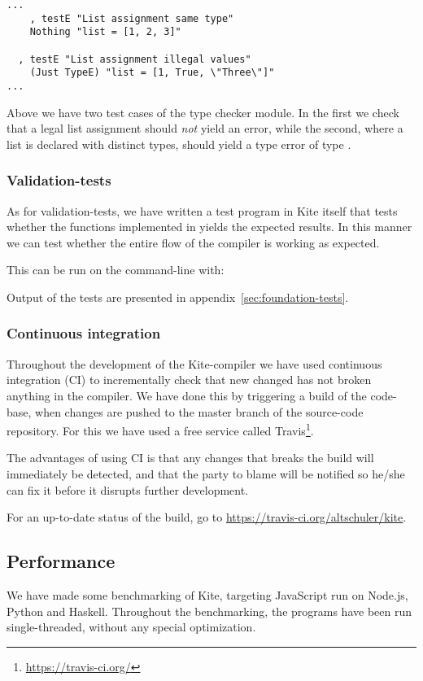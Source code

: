 \begin{lstlisting}[caption=\code{Kite.Test.TypeCheck.hs} snippet]
...
    , testE "List assignment same type"
    Nothing "list = [1, 2, 3]"

  , testE "List assignment illegal values"
    (Just TypeE) "list = [1, True, \"Three\"]"
...
\end{lstlisting}

Above we have two test cases of the type checker module. In the first we check that a legal list assignment should \emph{not} yield an error, while the second, where a list is declared with distinct types, should yield a type error of type .

\subsubsection{Validation-tests}

As for validation-tests, we have written a test program in Kite itself that tests whether the functions implemented in  yields the expected results. In this manner we can test whether the entire flow of the compiler is working as expected.

This can be run on the command-line with:


Output of the tests are presented in appendix~\ref{sec:foundation-tests}.

\subsubsection{Continuous integration}
Throughout the development of the Kite-compiler we have used continuous integration (CI) to incrementally check that new changed has not broken anything in the compiler. We have done this by triggering a build of the code-base, when changes are pushed to the master branch of the source-code repository. For this we have used a free service called Travis\footnote{\url{https://travis-ci.org/}}.

The advantages of using CI is that any changes that breaks the build will immediately be detected, and that the party to blame will be notified so he/she can fix it before it disrupts further development.

For an up-to-date status of the build, go to \url{https://travis-ci.org/altschuler/kite}.


\subsection{Performance}
We have made some benchmarking of Kite, targeting JavaScript run on Node.js, Python and Haskell. Throughout the benchmarking, the programs have been run single-threaded, without any special optimization.

